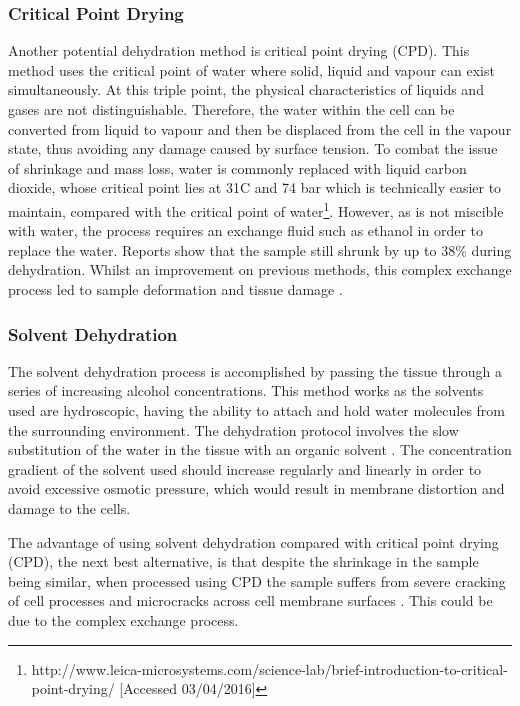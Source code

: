 \documentclass[a4paper, 11pt]{article}
\numberwithin{equation}{section}
\begin{document}
\subsubsection{Critical Point Drying}

Another potential dehydration method is critical point drying (CPD). This method uses the critical point of water where solid, liquid and vapour can exist simultaneously. At this triple point, the physical characteristics of liquids and gases are not distinguishable. Therefore, the water within the cell can be converted from liquid to vapour and then be displaced from the cell in the vapour state, thus avoiding any damage caused by surface tension. To combat the issue of shrinkage and mass loss, water is commonly replaced with liquid carbon dioxide, whose critical point lies at 31\degree C and 74 bar which is technically easier to maintain, compared with the critical point of water\footnote{http://www.leica-microsystems.com/science-lab/brief-introduction-to-critical-point-drying/ [Accessed 03/04/2016]}. However, as  is not miscible with water, the process requires an exchange fluid such as ethanol in order to replace the water. Reports show that the sample still shrunk by up to 38\% during dehydration. Whilst an improvement on previous methods, this complex exchange process led to sample deformation and tissue damage \cite{freezedryingvscriticalpoint}.

\subsubsection{Solvent Dehydration}

The solvent dehydration process is accomplished by passing the tissue through a series of increasing alcohol concentrations. This method works as the solvents used are hydroscopic, having the ability to attach and hold water molecules from the surrounding environment. The dehydration protocol involves the slow substitution of the water in the tissue with an organic solvent \cite{dehydrationmethod}. The concentration gradient of the solvent used should increase regularly and linearly in order to avoid excessive osmotic pressure, which would result in membrane distortion and damage to the cells.

The advantage of using solvent dehydration compared with critical point drying (CPD), the next best alternative, is that despite the shrinkage in the sample being similar, when processed using CPD the sample suffers from severe cracking of cell processes and microcracks across cell membrane surfaces \cite{JEMT1070300508}. This could be due to the complex exchange process.
\end{document}
